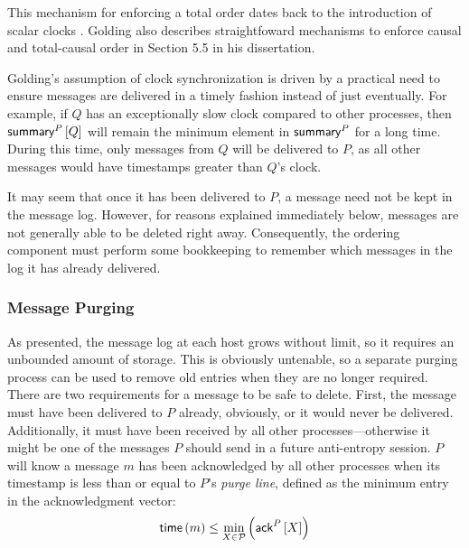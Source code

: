 \documentclass[]             %
{NASA}                       %
\theoremstyle{definition}
\begin{document}
This mechanism for enforcing a total order dates back to the
introduction of scalar clocks \cite{1978:lamportclocks}. Golding also
describes straightfoward mechanisms to enforce causal and total-causal
order in Section 5.5 in his dissertation.

Golding's assumption of clock synchronization is driven by a practical
need to ensure messages are delivered in a timely fashion instead of
just eventually. For example, if $Q$ has an exceptionally slow clock
compared to other processes, then $\textsf{summary}^{P}\left[Q\right]$ will remain the
minimum element in $\textsf{summary}^{P}$ for a long time. During this time,
only messages from $Q$ will be delivered to $P$, as all other messages
would have timestamps greater than $Q$'s clock.

It may seem that once it has been delivered to $P$, a message need not
be kept in the message log. However, for reasons explained immediately
below, messages are not generally able to be deleted right
away. Consequently, the ordering component must perform some
bookkeeping to remember which messages in the log it has already
delivered.

\subsubsection{Message Purging}
\label{sssec:tsae-message-purging}
As presented, the message log at each host grows without limit, so it
requires an unbounded amount of storage. This is obviously untenable,
so a separate purging process can be used to remove old entries when
they are no longer required. There are two requirements for a message
to be safe to delete. First, the message must have been delivered to
$P$ already, obviously, or it would never be delivered. Additionally,
it must have been received by all other processes---otherwise it might
be one of the messages $P$ should send in a future anti-entropy
session. $P$ will know a message $m$ has been acknowledged by all
other processes when its timestamp is less than or equal to $P$'s
\emph{purge line}, defined as the minimum entry in the acknowledgment
vector:
\[ \mathsf{time}\left(m\right) \leq \min_{X \in \mathcal{P}} \left( \textsf{ack}^{P}\left[X\right] \right) \]
\end{document}
